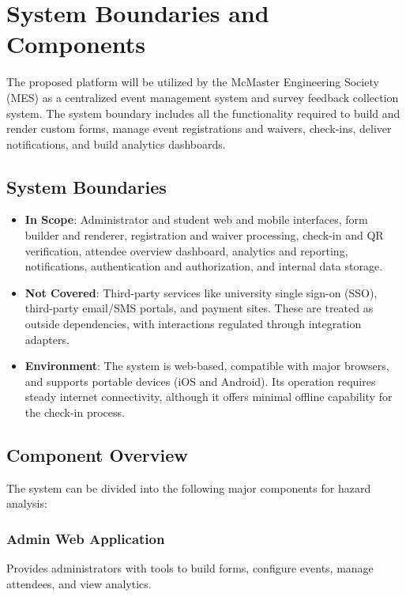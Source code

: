 \documentclass[12pt]{article}
\begin{document}
\section{System Boundaries and Components}

The proposed platform will be utilized by the McMaster Engineering Society (MES)
as a centralized event management system and survey feedback collection system.
The system boundary includes all the functionality required to build and render
custom forms, manage event registrations and waivers, check-ins, deliver
notifications, and build analytics dashboards.

\subsection{System Boundaries}

\begin{itemize}
    \item \textbf{In Scope}: Administrator and student web and mobile interfaces,
    form builder and renderer, registration and waiver processing, check-in and QR verification,
    attendee overview dashboard, analytics and reporting, notifications, authentication and authorization,
    and internal data storage.

    \item \textbf{Not Covered}: Third-party services like university single sign-on (SSO),
    third-party email/SMS portals, and payment sites. These are treated as outside dependencies,
    with interactions regulated through integration adapters.

    \item \textbf{Environment}: The system is web-based, compatible with major browsers,
    and supports portable devices (iOS and Android). Its operation requires steady internet connectivity,
    although it offers minimal offline capability for the check-in process.
\end{itemize}

\subsection{Component Overview}

The system can be divided into the following major components for hazard analysis:

\subsubsection{Admin Web Application}
Provides administrators with tools to build forms, configure events, manage attendees, and view analytics.
\end{document}
